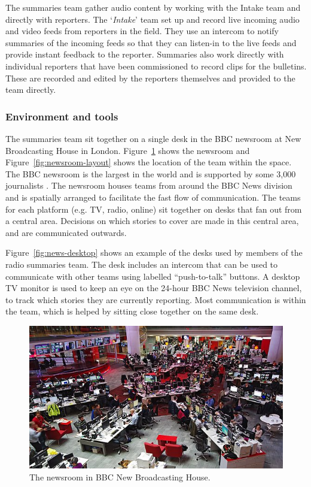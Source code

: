 The summaries team gather audio content by working with the Intake team and directly with reporters. The
`\textit{Intake}' team set up and record live incoming audio and video feeds from reporters in the field. They use an
intercom to notify summaries of the incoming feeds so that they can listen-in to the live feeds and provide instant
feedback to the reporter.  Summaries also work directly with individual reporters that have been commissioned to record
clips for the bulletins. These are recorded and edited by the reporters themselves and provided to the team directly.

\subsubsection{Environment and tools}
The summaries team sit together on a single desk in the BBC newsroom at New Broadcasting House in London.
Figure~\ref{fig:newsroom} shows the newsroom and Figure~\ref{fig:newsroom-layout} shows the location of the team within
the space. The BBC newsroom is the largest in the world and is supported by some 3,000 journalists
\citep[p.~80]{McLeish2015}.  The newsroom houses teams from around the BBC News division and is spatially arranged to
facilitate the fast flow of communication. The teams for each platform (e.g. TV, radio, online) sit together on desks
that fan out from a central area. Decisions on which stories to cover are made in this central area, and are
communicated outwards.

Figure~\ref{fig:news-desktop} shows an example of the desks used by members of the radio summaries team. The desk
includes an intercom that can be used to communicate with other teams using labelled ``push-to-talk'' buttons. A
desktop TV monitor is used to keep an eye on the 24-hour BBC News television channel, to track which stories they are
currently reporting. Most communication is within the team, which is helped by sitting close together on the same desk.

\begin{figure}
  \centering
  \includegraphics[width=\columnwidth]{figs/newsroom.jpg}
  \caption{The newsroom in BBC New Broadcasting House.}
  \label{fig:newsroom}
\end{figure}

